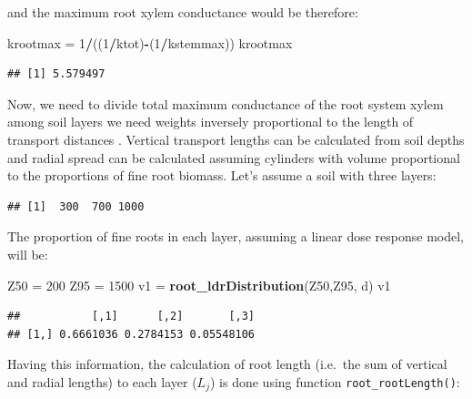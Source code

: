 \documentclass[]{book}
\newenvironment{Shaded}{\begin{snugshade}}{\end{snugshade}}
\newcommand{\KeywordTok}[1]{\textcolor[rgb]{0.13,0.29,0.53}{\textbf{#1}}}
\newcommand{\DecValTok}[1]{\textcolor[rgb]{0.00,0.00,0.81}{#1}}
\newcommand{\StringTok}[1]{\textcolor[rgb]{0.31,0.60,0.02}{#1}}
\newcommand{\OperatorTok}[1]{\textcolor[rgb]{0.81,0.36,0.00}{\textbf{#1}}}
\newcommand{\NormalTok}[1]{#1}
\begin{document}
and the maximum root xylem conductance would be therefore:

\begin{Shaded}
\begin{Highlighting}[]
\NormalTok{krootmax =}\StringTok{ }\DecValTok{1}\OperatorTok{/}\NormalTok{((}\DecValTok{1}\OperatorTok{/}\NormalTok{ktot)}\OperatorTok{-}\NormalTok{(}\DecValTok{1}\OperatorTok{/}\NormalTok{kstemmax))}
\NormalTok{krootmax}
\end{Highlighting}
\end{Shaded}

\begin{verbatim}
## [1] 5.579497
\end{verbatim}

Now, we need to divide total maximum conductance of the root system xylem among soil layers we need weights inversely proportional to the length of transport distances \citep{Sperry2016}. Vertical transport lengths can be calculated from soil depths and radial spread can be calculated assuming cylinders with volume proportional to the proportions of fine root biomass. Let's assume a soil with three layers:

\begin{Shaded}
\end{Shaded}

\begin{verbatim}
## [1]  300  700 1000
\end{verbatim}

The proportion of fine roots in each layer, assuming a linear dose response model, will be:

\begin{Shaded}
\begin{Highlighting}[]
\NormalTok{Z50 =}\StringTok{ }\DecValTok{200}
\NormalTok{Z95 =}\StringTok{ }\DecValTok{1500}
\NormalTok{v1 =}\StringTok{ }\KeywordTok{root_ldrDistribution}\NormalTok{(Z50,Z95, d)}
\NormalTok{v1}
\end{Highlighting}
\end{Shaded}

\begin{verbatim}
##           [,1]      [,2]       [,3]
## [1,] 0.6661036 0.2784153 0.05548106
\end{verbatim}

Having this information, the calculation of root length (i.e.~the sum of vertical and radial lengths) to each layer (\(L_j\)) is done using function \texttt{root\_rootLength()}:
\end{document}
